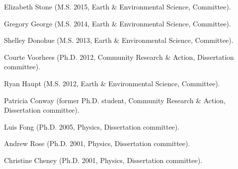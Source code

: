 \item Elizabeth Stone (M.S. 2015, Earth \& Environmental Science, Committee).
\item Gregory George (M.S. 2014, Earth \& Environmental Science, Committee).
\item Shelley Donohue (M.S. 2013, Earth \& Environmental Science, Committee).
\item Courte Voorhees (Ph.D. 2012,  Community Research \& Action, Dissertation committee).
\item Ryan Haupt (M.S. 2012, Earth \& Environmental Science, Committee).
\item Patricia Conway (former Ph.D. student, Community Research \& Action, Dissertation committee).
\item Luis Fong (Ph.D. 2005, Physics, Dissertation committee).
\item Andrew Rose (Ph.D. 2001, Physics, Dissertation committee).
\item Christine Cheney (Ph.D. 2001, Physics, Dissertation committee).
